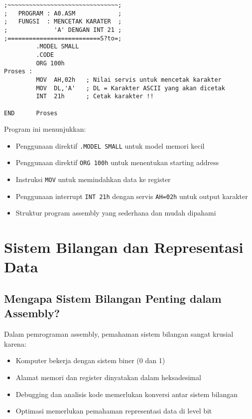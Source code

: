 \documentclass[../main.tex]{subfiles}
\begin{document}
            \begin{lstlisting}[language={[x86masm]Assembler}, caption={Program Assembly Sederhana - Output Karakter}, label={lst:assembly_example}]
;~~~~~~~~~~~~~~~~~~~~~~~~~~~~~~~; 
;   PROGRAM : A0.ASM            ; 
;   FUNGSI  : MENCETAK KARATER  ; 
;             'A' DENGAN INT 21 ; 
;==========================S?to=; 
         .MODEL SMALL 
         .CODE 
         ORG 100h 
Proses :  
         MOV  AH,02h   ; Nilai servis untuk mencetak karakter 
         MOV  DL,'A'   ; DL = Karakter ASCII yang akan dicetak 
         INT  21h      ; Cetak karakter !! 
         
END      Proses
            \end{lstlisting}

            Program ini menunjukkan:
            \begin{itemize}
                \item Penggunaan direktif \texttt{.MODEL SMALL} untuk model memori kecil
                \item Penggunaan direktif \texttt{ORG 100h} untuk menentukan starting address
                \item Instruksi \texttt{MOV} untuk memindahkan data ke register
                \item Penggunaan interrupt \texttt{INT 21h} dengan servis \texttt{AH=02h} untuk output karakter
                \item Struktur program assembly yang sederhana dan mudah dipahami
            \end{itemize}

\section{Sistem Bilangan dan Representasi Data}\label{sec:pengenalan-sistem-bilangan}

    \subsection{Mengapa Sistem Bilangan Penting dalam Assembly?}
        Dalam pemrograman assembly, pemahaman sistem bilangan sangat krusial karena:
        \begin{itemize}
            \item Komputer bekerja dengan sistem biner (0 dan 1)
            \item Alamat memori dan register dinyatakan dalam heksadesimal
            \item Debugging dan analisis kode memerlukan konversi antar sistem bilangan
            \item Optimasi memerlukan pemahaman representasi data di level bit
        \end{itemize}
\end{document}

